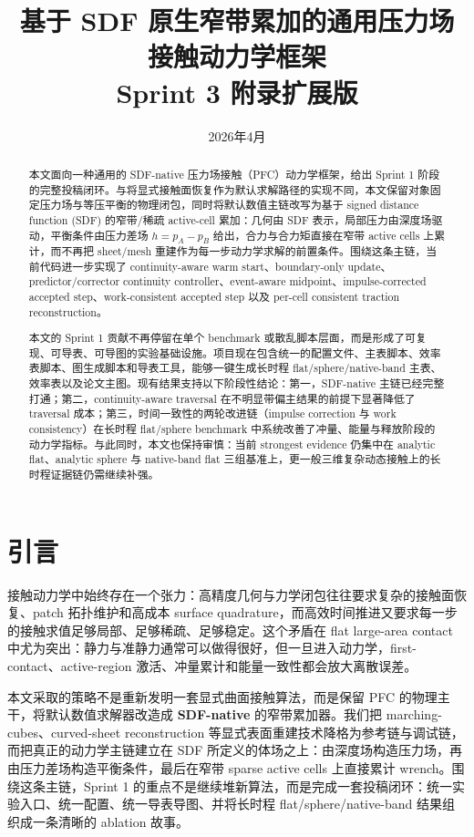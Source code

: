 \documentclass[11pt,a4paper]{ctexart}
\title{基于 SDF 原生窄带累加的通用压力场接触动力学框架\\Sprint 3 附录扩展版}
\author{}
\date{2026年4月}
\begin{document}
\maketitle

\begin{abstract}
本文面向一种通用的 SDF-native 压力场接触（PFC）动力学框架，给出 Sprint 1 阶段的完整投稿闭环。与将显式接触面恢复作为默认求解路径的实现不同，本文保留对象固定压力场与等压平衡的物理闭包，同时将默认数值主链改写为基于 signed distance function (SDF) 的窄带/稀疏 active-cell 累加：几何由 SDF 表示，局部压力由深度场驱动，平衡条件由压力差场 $h=p_A-p_B$ 给出，合力与合力矩直接在窄带 active cells 上累计，而不再把 sheet/mesh 重建作为每一步动力学求解的前置条件。围绕这条主链，当前代码进一步实现了 continuity-aware warm start、boundary-only update、predictor/corrector continuity controller、event-aware midpoint、impulse-corrected accepted step、work-consistent accepted step 以及 per-cell consistent traction reconstruction。

本文的 Sprint 1 贡献不再停留在单个 benchmark 或散乱脚本层面，而是形成了可复现、可导表、可导图的实验基础设施。项目现在包含统一的配置文件、主表脚本、效率表脚本、图生成脚本和导表工具，能够一键生成长时程 flat/sphere/native-band 主表、效率表以及论文主图。现有结果支持以下阶段性结论：第一，SDF-native 主链已经完整打通；第二，continuity-aware traversal 在不明显带偏主结果的前提下显著降低了 traversal 成本；第三，时间一致性的两轮改进链（impulse correction 与 work consistency）在长时程 flat/sphere benchmark 中系统改善了冲量、能量与释放阶段的动力学指标。与此同时，本文也保持审慎：当前 strongest evidence 仍集中在 analytic flat、analytic sphere 与 native-band flat 三组基准上，更一般三维复杂动态接触上的长时程证据链仍需继续补强。
\end{abstract}

\tableofcontents

\section{引言}
接触动力学中始终存在一个张力：高精度几何与力学闭包往往要求复杂的接触面恢复、patch 拓扑维护和高成本 surface quadrature，而高效时间推进又要求每一步的接触求值足够局部、足够稀疏、足够稳定。这个矛盾在 flat large-area contact 中尤为突出：静力与准静力通常可以做得很好，但一旦进入动力学，first-contact、active-region 激活、冲量累计和能量一致性都会放大离散误差。

本文采取的策略不是重新发明一套显式曲面接触算法，而是保留 PFC 的物理主干，将默认数值求解器改造成 \textbf{SDF-native} 的窄带累加器。我们把 marching-cubes、curved-sheet reconstruction 等显式表面重建技术降格为参考链与调试链，而把真正的动力学主链建立在 SDF 所定义的体场之上：由深度场构造压力场，再由压力差场构造平衡条件，最后在窄带 sparse active cells 上直接累计 wrench。围绕这条主链，Sprint 1 的重点不是继续堆新算法，而是完成一套投稿闭环：统一实验入口、统一配置、统一导表导图、并将长时程 flat/sphere/native-band 结果组织成一条清晰的 ablation 故事。
\end{document}
